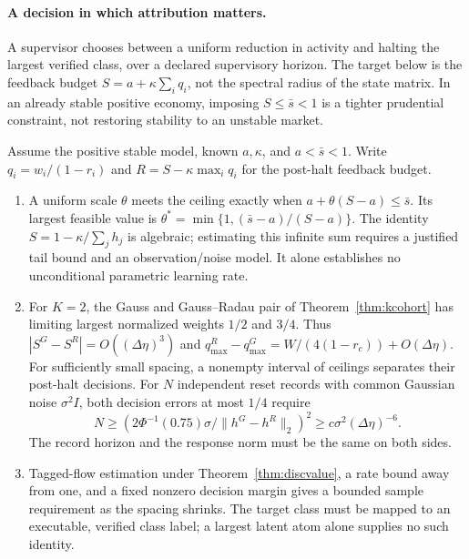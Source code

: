 \paragraph{A decision in which attribution matters.} A supervisor chooses between a uniform reduction in activity and halting the largest verified class, over a declared supervisory horizon. The target below is the feedback budget $S=a+\kappa\sum_i q_i$, not the spectral radius of the state matrix. In an already stable positive economy, imposing $S\le\bar s<1$ is a tighter prudential constraint, not restoring stability to an unstable market.

\begin{proposition}\label{prop:target}
Assume the positive stable model, known $a,\kappa$, and $a<\bar s<1$. Write $q_i=w_i/(1-r_i)$ and $R=S-\kappa\max_iq_i$ for the post-halt feedback budget.
\begin{enumerate}[label=(\roman*),itemsep=1pt]
\item A uniform scale $\theta$ meets the ceiling exactly when $a+\theta(S-a)\le\bar s$. Its largest feasible value is $\theta^*=\min\{1,(\bar s-a)/(S-a)\}$. The identity $S=1-\kappa/\sum_jh_j$ is algebraic; estimating this infinite sum requires a justified tail bound and an observation/noise model. It alone establishes no unconditional parametric learning rate.
\item For $K=2$, the Gauss and Gauss--Radau pair of Theorem~\ref{thm:kcohort} has limiting largest normalized weights $1/2$ and $3/4$. Thus $|S^G-S^R|=O((\Delta\eta)^3)$ and $q^R_{\max}-q^G_{\max}=W/(4(1-r_c))+O(\Delta\eta)$. For sufficiently small spacing, a nonempty interval of ceilings separates their post-halt decisions. For $N$ independent reset records with common Gaussian noise $\sigma^2 I$, both decision errors at most $1/4$ require
\[
 N\ge (2\Phi^{-1}(0.75)\sigma/\|h^G-h^R\|_2)^2
 \ge c\sigma^2(\Delta\eta)^{-6}.
\]
The record horizon and the response norm must be the same on both sides.
\item Tagged-flow estimation under Theorem~\ref{thm:discvalue}, a rate bound away from one, and a fixed nonzero decision margin gives a bounded sample requirement as the spacing shrinks. The target class must be mapped to an executable, verified class label; a largest latent atom alone supplies no such identity.
\end{enumerate}
\end{proposition}

